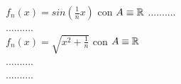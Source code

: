 \example $f_n(x)=sin\left(\frac{1}{n}x\right)$ con $A\equiv \mathbb{R}$
..........\\
..........\\
\example $f_n(x)=\sqrt{x^2+\frac{1}{n}}$ con $A\equiv \mathbb{R}$\\
..........\\
..........\\


